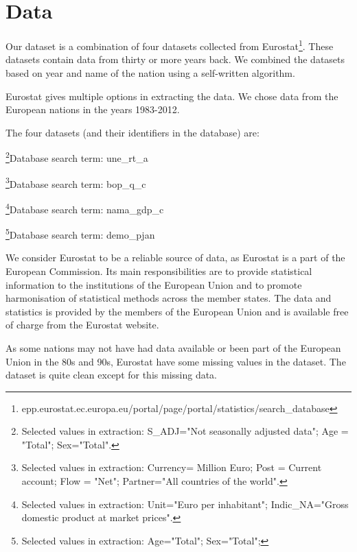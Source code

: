 \section{Data}
\label{DataSets}
Our dataset is a combination of four datasets collected from Eurostat\footnote{epp.eurostat.ec.europa.eu/portal/page/portal/statistics/search\_database}. These datasets contain data from thirty or more years back. We combined the datasets based on year and name of the nation using a self-written algorithm. 

Eurostat gives multiple options in extracting the data. We chose data from the European nations in the years 1983-2012.

The four datasets (and their identifiers in the database) are:
\begin{my_description}
\item[Unemployment rate]\footnote{Selected values in extraction: S\_ADJ="Not seasonally adjusted data"; Age = "Total"; Sex="Total".}Database search term: une\_rt\_a 
\item[Balance of payments]\footnote{Selected values in extraction: Currency= Million Euro; Post = Current account; Flow = "Net"; Partner="All countries of the world".}Database search term: bop\_q\_c
\item[GDP per inhabitant]\footnote{Selected values in extraction: Unit="Euro per inhabitant"; Indic\_NA="Gross domestic product at market prices".}Database search term: nama\_gdp\_c
\item[Population]\footnote{Selected values in extraction: Age="Total"; Sex="Total";}Database search term: demo\_pjan
\end{my_description}

We consider Eurostat to be a reliable source of data, as Eurostat is a part of the European Commission. Its main responsibilities are to provide statistical information to the institutions of the European Union and to promote harmonisation of statistical methods across the member states. The data and statistics is provided by the members of the European Union and is available free of charge from the Eurostat website.

As some nations may not have had data available or been part of the European Union in the 80s and 90s, Eurostat have some missing values in the dataset. The dataset is quite clean except for this missing data.
